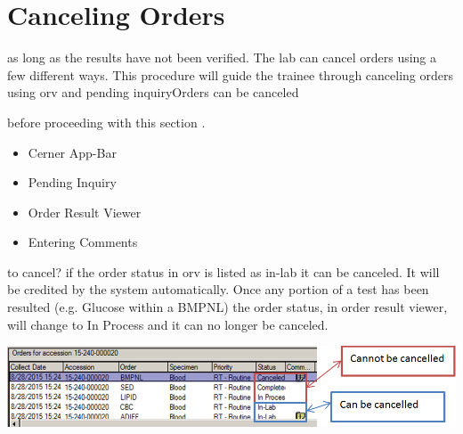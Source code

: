 \chapter*{Canceling Orders}\label{ch:canceling}
 as long as the results have not been verified. The lab can cancel orders using a few different ways. This procedure will guide the trainee through canceling orders using {orv} and {pending inquiry}Orders can be canceled




\bigskip

 before proceeding with this section%
.
\begin{itemize}
   \item Cerner App-Bar
   \item {Pending Inquiry}
   \item Order Result Viewer
   \item Entering Comments
 \end{itemize}


 to cancel? if the order status in {orv} is listed as {in-lab} it can be canceled. It will be credited by the system automatically. Once any portion of a test has been resulted (e.g. Glucose within a BMPNL) the order status, in {order result viewer}, will change to In Process and it can no longer be canceled.


\bigskip
\bigskip


\begin{minipage}{\textwidth}
\noindent
\includegraphics[width=\textwidth]{ORV/graphics/statuses.png}
\end{minipage}


